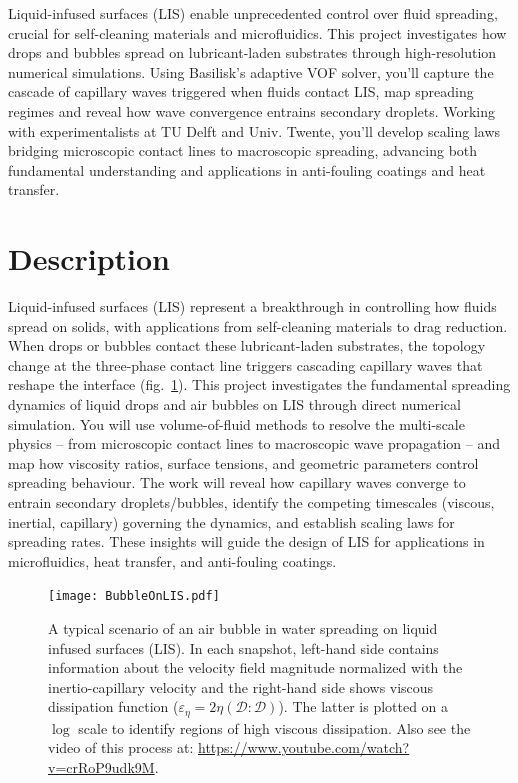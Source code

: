 \documentclass[11pt]{article}
\begin{document}
\begin{tcolorbox}[colback=mgray,colframe=mpurple,title=TL;DR]
    Liquid-infused surfaces (LIS) enable unprecedented control over fluid spreading, crucial for self-cleaning materials and microfluidics. This project investigates how drops and bubbles spread on lubricant-laden substrates through high-resolution numerical simulations. Using Basilisk's adaptive VOF solver, you'll capture the cascade of capillary waves triggered when fluids contact LIS, map spreading regimes and reveal how wave convergence entrains secondary droplets. Working with experimentalists at TU Delft and Univ. Twente, you'll develop scaling laws bridging microscopic contact lines to macroscopic spreading, advancing both fundamental understanding and applications in anti-fouling coatings and heat transfer.
\end{tcolorbox}

\section*{Description}

Liquid-infused surfaces (LIS) represent a breakthrough in controlling how fluids spread on solids, with applications from self-cleaning materials to drag reduction. 
When drops or bubbles contact these lubricant-laden substrates, the topology change at the three-phase contact line triggers cascading capillary waves that reshape the interface (fig.~\ref{Figure::Typical}). This project investigates the fundamental spreading dynamics of liquid drops and air bubbles on LIS through direct numerical simulation. You will use volume-of-fluid methods to resolve the multi-scale physics -- from microscopic contact lines to macroscopic wave propagation -- and map how viscosity ratios, surface tensions, and geometric parameters control spreading behaviour. The work will reveal how capillary waves converge to entrain secondary droplets/bubbles, identify the competing timescales (viscous, inertial, capillary) governing the dynamics, and establish scaling laws for spreading rates. These insights will guide the design of LIS for applications in microfluidics, heat transfer, and anti-fouling coatings.

\begin{figure}
	\begin{center}
		\texttt{[image: BubbleOnLIS.pdf]}
		\caption{A typical scenario of an air bubble in water spreading on liquid infused surfaces (LIS). In each snapshot, left-hand side contains information about the velocity field magnitude normalized with the inertio-capillary velocity and the right-hand side shows viscous dissipation function ($\varepsilon_\eta = 2\eta\left(\boldsymbol{\mathcal{D}:\mathcal{D}}\right)$). The latter is plotted on a $\log$ scale to identify regions of high viscous dissipation. Also see the video of this process at: \href{https://www.youtube.com/watch?v=crRoP9udk9M}{https://www.youtube.com/watch?v=crRoP9udk9M}.}
		\label{Figure::Typical}
\end{center}
\end{figure}
\end{document}
